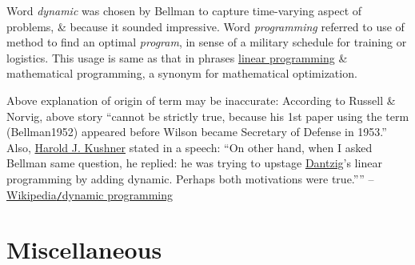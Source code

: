 \documentclass{article}
\begin{document}
Word {\it dynamic} was chosen by {\sc Bellman} to capture time-varying aspect of problems, \& because it sounded impressive. Word {\it programming} referred to use of method to find an optimal {\it program}, in sense of a military schedule for training or logistics. This usage is same as that in phrases \href{https://en.wikipedia.org/wiki/Linear_programming}{linear programming} \& mathematical programming, a synonym for mathematical optimization.

Above explanation of origin of term may be inaccurate: According to {\sc Russell \& Norvig}, above story ``cannot be strictly true, because his 1st paper using the term (Bellman1952) appeared before {\sc Wilson} became Secretary of Defense in 1953.'' Also, \href{https://en.wikipedia.org/wiki/Harold_J._Kushner}{\sc Harold J. Kushner} stated in a speech: ``On other hand, when I asked {\sc Bellman} same question, he replied: he was trying to upstage \href{https://en.wikipedia.org/wiki/George_Dantzig}{\sc Dantzig}'s linear programming by adding dynamic. Perhaps both motivations were true.'''' -- \href{https://en.wikipedia.org/wiki/Dynamic_programming}{Wikipedia{\tt/}dynamic programming}


\section{Miscellaneous}


\printbibliography[heading=bibintoc]
	
\end{document}

